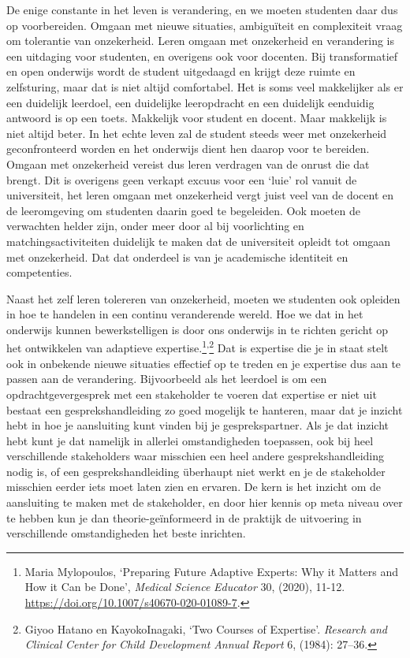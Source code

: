 \documentclass[smallauthor, chapterhaspagenum, nochapterinheader, pagenuminheader,  bigchapnum,medium2, tocpages,  garamond, titleinheader]{jote-book}
\begin{document}
	De enige constante in het leven is verandering, en we moeten studenten daar dus op voorbereiden. Omgaan met nieuwe situaties, ambiguïteit en complexiteit vraag om tolerantie van onzekerheid. Leren omgaan met onzekerheid en verandering is een uitdaging voor studenten, en overigens ook voor docenten. Bij transformatief en open onderwijs wordt de student uitgedaagd en krijgt deze ruimte en zelfsturing, maar dat is niet altijd comfortabel. Het is soms veel makkelijker als er een duidelijk leerdoel, een duidelijke leeropdracht en een duidelijk eenduidig antwoord is op een toets. Makkelijk voor student en docent. Maar makkelijk is niet altijd beter. In het echte leven zal de student steeds weer met onzekerheid geconfronteerd worden en het onderwijs dient hen daarop voor te bereiden. Omgaan met onzekerheid vereist dus leren verdragen van de onrust die dat brengt. Dit is overigens geen verkapt excuus voor een ‘luie' rol vanuit de universiteit, het leren omgaan met onzekerheid vergt juist veel van de docent en de leeromgeving om studenten daarin goed te begeleiden. Ook moeten de verwachten helder zijn, onder meer door al bij voorlichting en matchingsactiviteiten duidelijk te maken dat de universiteit opleidt tot omgaan met onzekerheid. Dat dat onderdeel is van je academische identiteit en competenties.



	Naast het zelf leren tolereren van onzekerheid, moeten we studenten ook opleiden in hoe te handelen in een continu veranderende wereld. Hoe we dat in het onderwijs kunnen bewerkstelligen is door ons onderwijs in te richten gericht op het ontwikkelen van adaptieve expertise.\footnote{Maria Mylopoulos, ‘Preparing Future Adaptive Experts: Why it Matters and How it Can be Done', \emph{Medical}\emph{ }\emph{Science}\emph{ }\emph{Educator} 30, (2020), 11-12. \href{https://doi.org/10.1177/0002764213498851}{https://doi.org/10.1007/s40670-020-01089-7}.}\textsuperscript{,}\footnote{Giyoo Hatano en KayokoInagaki, ‘Two Courses of Expertise'. \emph{Research }\emph{and}\emph{ }\emph{Clinical}\emph{ Center }\emph{for}\emph{ Child Development }\emph{Annual}\emph{ Report}\emph{ }6, (1984): 27--36.} Dat is expertise die je in staat stelt ook in onbekende nieuwe situaties effectief op te treden en je expertise dus aan te passen aan de verandering. Bijvoorbeeld als het leerdoel is om een opdrachtgevergesprek met een stakeholder te voeren dat expertise er niet uit bestaat een gesprekshandleiding zo goed mogelijk te hanteren, maar dat je inzicht hebt in hoe je aansluiting kunt vinden bij je gesprekspartner. Als je dat inzicht hebt kunt je dat namelijk in allerlei omstandigheden toepassen, ook bij heel verschillende stakeholders waar misschien een heel andere gesprekshandleiding nodig is, of een gesprekshandleiding überhaupt niet werkt en je de stakeholder misschien eerder iets moet laten zien en ervaren. De kern is het inzicht om de aansluiting te maken met de stakeholder, en door hier kennis op meta niveau over te hebben kun je dan theorie-geïnformeerd in de praktijk de uitvoering in verschillende omstandigheden het beste inrichten.
\end{document}
